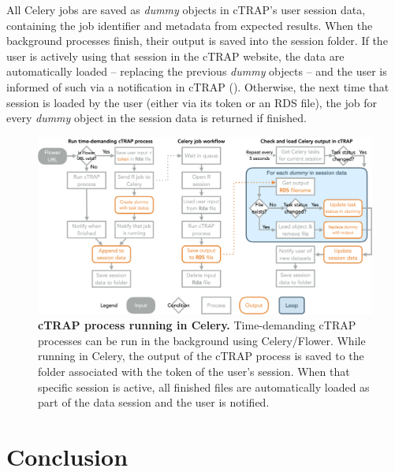 All Celery jobs are saved as \emph{dummy} objects in cTRAP's user session data, containing the job identifier and metadata from expected results. When the background processes finish, their output is saved into the session folder. If the user is actively using that session in the cTRAP website, the data are automatically loaded -- replacing the previous \emph{dummy} objects -- and the user is informed of such via a notification in cTRAP (). Otherwise, the next time that session is loaded by the user (either via its token or an RDS file), the job for every \emph{dummy} object in the session data is returned if finished.

\begin{figure}[!htb]
  \includegraphics[width=\textwidth]{images/ctrap/celery-job}
  \centering
  \caption[cTRAP process running in Celery]{\textbf{cTRAP process running in Celery.} Time-demanding cTRAP processes can be run in the background using Celery/Flower. While running in Celery, the output of the cTRAP process is saved to the folder associated with the token of the user's session. When that specific session is active, all finished files are automatically loaded as part of the data session and the user is notified.}
  \label{fig:ctrap-celery}
\end{figure}

\section{Conclusion}


